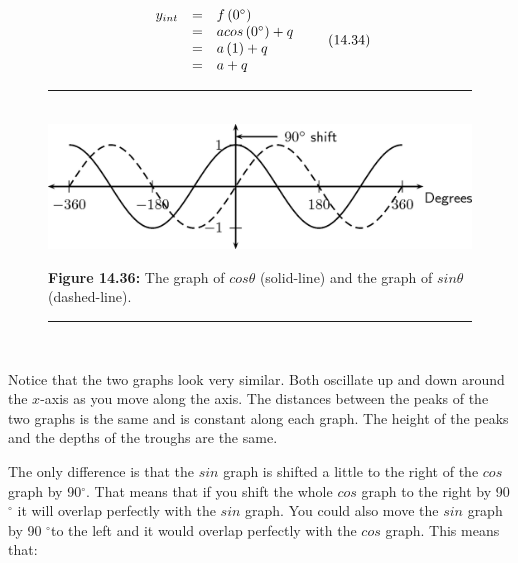 \label{m39414*id88517}\nopagebreak\noindent{}
\begin{equation}
\begin{array}{ccc}\hfill {y}_{int}& =& f\left({0}^{\circ }\right)\hfill \\ & =& acos\left({0}^{\circ }\right)+q\hfill \\ & =& a\left(1\right)+q\hfill \\ & =& a+q\hfill \end{array}\tag{14.34}
\end{equation}
\label{m39414*uid68}
\nopagebreak
\setcounter{subfigure}{0}
\begin{figure}[H] %
\begin{center}
\rule[.1in]{\figurerulewidth}{.005in} \\
\label{m39414*uid69!!!underscore!!!media}\label{m39414*uid69!!!underscore!!!printimage}\includegraphics{col11306.imgs/m39414_MG10C15_030.png} %
\vspace{2pt}
\vspace{\rubberspace}\par \begin{cnxcaption}
\small \textbf{Figure 14.36: }The graph of $cos\theta $ (solid-line) and the graph of $sin\theta $ (dashed-line).
\end{cnxcaption}
\vspace{.1in}
\rule[.1in]{\figurerulewidth}{.005in} \\
\end{center}
\end{figure}       
\label{m39414*id88718}Notice that the two graphs look very similar. Both oscillate up and down around the $x$-axis as you move along the axis. The distances between the peaks of the two graphs is the same and is constant along each graph. The height of the peaks and the depths of the troughs are the same.\par 
\label{m39414*id88733}The only difference is that the $sin$ graph is shifted a little to the right of the $cos$ graph by 90${}^{\circ }$. That means that if you shift the whole $cos$ graph to the right by 90 ${}^{\circ }$ it will overlap perfectly with the $sin$ graph. You could also move the $sin$ graph by 90 ${}^{\circ }$to the left and it would overlap perfectly with the $cos$ graph. This means that:\par 
